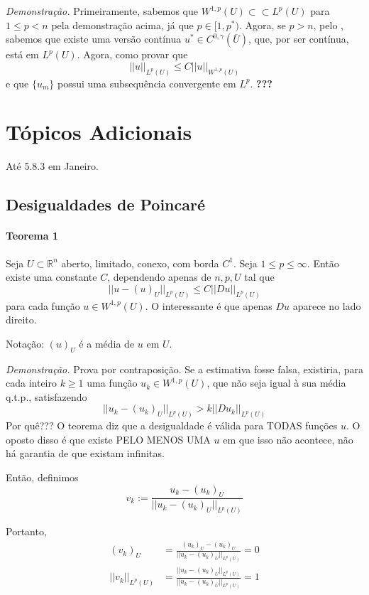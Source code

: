 \documentclass[11pt]{article}
\begin{document}
\textit{Demonstração.} Primeiramente, sabemos que $W^{1,p}(U) \subset\subset L^p(U)$ para $1\leq p < n$ pela demonstração acima, já que $p \in [1,p^*)$. Agora, se $p>n$, pelo , sabemos que existe uma versão contínua $u^* \in C^{0, \gamma}(\overline{U})$, que, por ser contínua, está em $L^p(U)$. Agora, como provar que \[ ||u||_{L^p(U)} \leq C ||u||_{W^{1,p}(U)} \] e que $\{u_m\}$ possui uma subsequência convergente em $L^p$. \textbf{???}








\section{Tópicos Adicionais}

Até 5.8.3 em Janeiro.


\subsection{Desigualdades de Poincaré}

\paragraph{Teorema 1}\label{t:sobolev-poincare-t1} Seja \(U \subset \mathbb{R}^n \) aberto, limitado, conexo, com borda \(C^1\). Seja \(1 \leq p \leq \infty \). Então existe uma constante \(C\), dependendo apenas de \(n, p, U\) tal que \[ ||u- (u)_U ||_{L^p(U)} \leq C ||Du||_{L^p(U)} \] para cada função \(u \in W^{1,p}(U)\). O interessante é que apenas \(Du\) aparece no lado direito.

Notação: \((u)_U\) é a média de \(u\) em \(U\).

\textit{Demonstração.} Prova por contraposição. Se a estimativa fosse falsa, existiria, para cada inteiro $k\geq1$ uma função $u_k \in W^{1,p}(U)$, que não seja igual à sua média q.t.p., satisfazendo \begin{equation}\label{eq:desig-poincare-1}
	 ||u_k - (u_k)_U ||_{L^p(U)} > k || Du_k ||_{L^p(U)}
\end{equation}  Por quê??? O teorema diz que a desigualdade é válida para TODAS funções $u$. O oposto disso é que existe PELO MENOS UMA $u$ em que isso não acontece, não há garantia de que existam infinitas.

Então, definimos \[v_k := \frac{u_k - (u_k)_U}{||u_k - (u_k)_U||_{L^p(U)}} \]

Portanto, \begin{align*}
	(v_k)_U &= \frac{(u_k)_U - (u_k)_U}{||u_k - (u_k)_U||_{L^p(U)}} = 0 \\
	||v_k||_{L^p(U)} &= \frac{||u_k - (u_k)_U||_{L^p(U)}}{||u_k - (u_k)_U||_{L^p(U)}} = 1
\end{align*}
\end{document}
